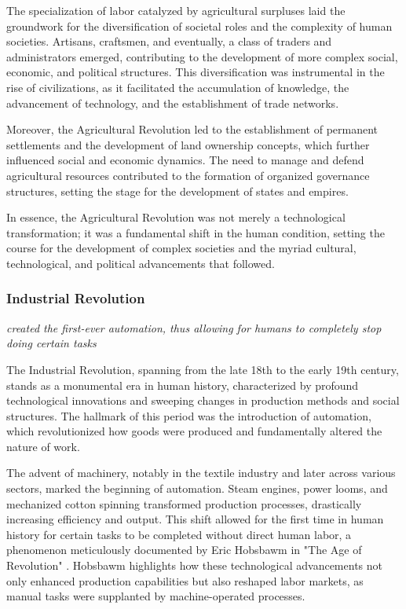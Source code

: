 \documentclass{article}
\begin{document}
The specialization of labor catalyzed by agricultural surpluses laid the groundwork for the diversification of societal roles and the complexity of human societies. Artisans, craftsmen, and eventually, a class of traders and administrators emerged, contributing to the development of more complex social, economic, and political structures. This diversification was instrumental in the rise of civilizations, as it facilitated the accumulation of knowledge, the advancement of technology, and the establishment of trade networks.

Moreover, the Agricultural Revolution led to the establishment of permanent settlements and the development of land ownership concepts, which further influenced social and economic dynamics. The need to manage and defend agricultural resources contributed to the formation of organized governance structures, setting the stage for the development of states and empires.

In essence, the Agricultural Revolution was not merely a technological transformation; it was a fundamental shift in the human condition, setting the course for the development of complex societies and the myriad cultural, technological, and political advancements that followed.

\subsubsection{Industrial Revolution}
\label{sec:IndustrialRevolution}

\textit{created the first-ever automation, thus allowing for humans to completely stop doing certain tasks}

The Industrial Revolution, spanning from the late 18th to the early 19th century, stands as a monumental era in human history, characterized by profound technological innovations and sweeping changes in production methods and social structures. The hallmark of this period was the introduction of automation, which revolutionized how goods were produced and fundamentally altered the nature of work.

The advent of machinery, notably in the textile industry and later across various sectors, marked the beginning of automation. Steam engines, power looms, and mechanized cotton spinning transformed production processes, drastically increasing efficiency and output. This shift allowed for the first time in human history for certain tasks to be completed without direct human labor, a phenomenon meticulously documented by Eric Hobsbawm in "The Age of Revolution" \cite{Hobsbawm1996Age}. Hobsbawm highlights how these technological advancements not only enhanced production capabilities but also reshaped labor markets, as manual tasks were supplanted by machine-operated processes.
\end{document}

